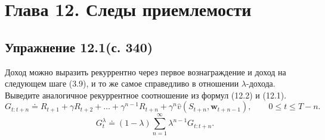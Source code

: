 \section{Глава 12. Следы приемлемости}

\subsection{Упражнение 12.1(с. 340)}
Доход можно выразить рекуррентно через первое вознаграждение и доход на следующем
шаге (3.9), и то же самое справедливо в отношении $\lambda$-дохода. Выведите
аналогичное рекуррентное соотношение из формул (12.2) и (12.1).
\begin{equation}
    G_{t:t+n} \doteq R_{t+1} + \gamma R_{t+2} + \dots + \gamma^{n-1} R_{t+n}
    + \gamma^n \hat v(S_{t+n}, \mathbf w_{t+n-1}), \qquad 0 \le t \le T-n.
    \tag{12.1}
\end{equation}
\begin{equation}
    G_t^\lambda \doteq (1-\lambda) \sum_{n=1}^\infty \lambda^{n-1} G_{t:t+n}.
    \tag{12.2}
\end{equation}
